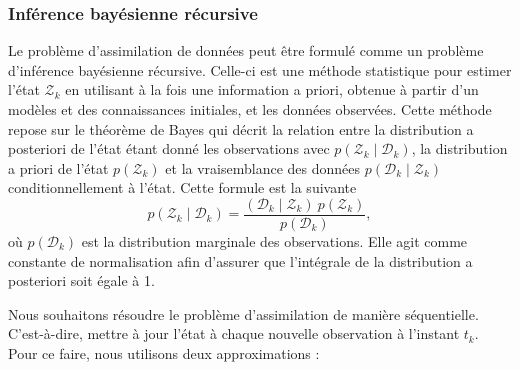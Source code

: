 \subsubsection{Inférence bayésienne récursive}

Le problème d'assimilation de données peut être formulé comme un problème d'inférence bayésienne récursive. Celle-ci est une méthode statistique pour estimer l'état $\mathcal Z_k$ en utilisant à la fois une information a priori, obtenue à partir d'un modèles et des connaissances initiales, et les données observées. Cette méthode repose sur le théorème de Bayes qui décrit la relation entre la distribution a posteriori de l'état étant donné les observations avec $p(\mathcal Z_k \mid \mathcal D_k)$, la distribution a priori de l'état $p(\mathcal Z_k)$ et la vraisemblance des données $p(\mathcal D_k \mid \mathcal Z_k)$ conditionnellement à l'état. Cette formule est la suivante
\begin{equation*}
    p(\mathcal Z_k \mid \mathcal D_k) = \frac{(\mathcal D_k \mid \mathcal Z_k)~p(\mathcal Z_k)}{p(\mathcal D_k)},
\end{equation*}où $p(\mathcal D_k)$  est la distribution marginale des observations. Elle agit comme constante de normalisation afin d'assurer que l'intégrale de la distribution a posteriori soit égale à 1.


Nous souhaitons résoudre le problème d'assimilation de manière séquentielle. C'est-à-dire, mettre à jour l'état à chaque nouvelle observation à l'instant $t_k$. Pour ce faire, nous utilisons deux approximations :


